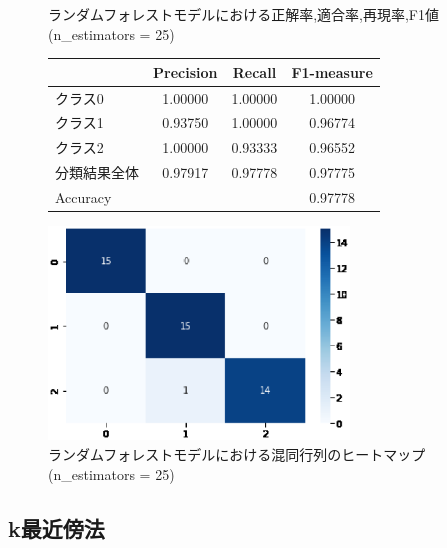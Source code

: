 \documentclass{jarticle}     %
\makeatletter
\newcommand{\tblcaption}[1]{\def\@captype{table}\caption{#1}}
\makeatother
\begin{document}
\begin{figure}[H]
  \def\@captype{table}
  \begin{minipage}[c]{.48\textwidth}
    \tblcaption{ランダムフォレストモデルにおける正解率,適合率,再現率,F1値(n\_estimators = 25)}
    \label{table:ランダムフォレスト}
    \centering
      \begin{tabular}{lccc}
        \hline
        & Precision  &  Recall &  F1-measure \\
        \hline
        クラス0  & 1.00000  & 1.00000 & 1.00000 \\
        クラス1  & 0.93750  & 1.00000 & 0.96774 \\
        クラス2  & 1.00000  & 0.93333 & 0.96552 \\
        分類結果全体  &  0.97917  &  0.97778 & 0.97775 \\
        \hline
        Accuracy & & & 0.97778\\
        \hline
      \end{tabular}
  \end{minipage}
  \hfill
  \begin{minipage}[c]{.48\textwidth}
    \includegraphics[width=80mm]{assets/forest_heatmap.eps}
    \caption{ランダムフォレストモデルにおける混同行列のヒートマップ(n\_estimators = 25)}
    \label{fig:ランダムフォレスト}
  \end{minipage}
\end{figure}

\subsection{k最近傍法}
\end{document}
